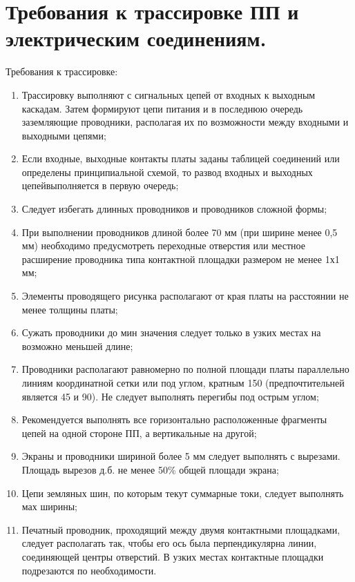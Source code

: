 \documentclass[unicode, 12pt, a4paper, oneside]{article}
\begin{document}
\section{Требования к трассировке ПП и электрическим соединениям.}

Требования к трассировке:

\begin{enumerate}
\item Трассировку выполняют с сигнальных цепей от входных к выходным каскадам. Затем формируют цепи питания и в последнюю очередь заземляющие проводники, располагая их по возможности между входными и выходными цепями;
\item Если входные, выходные контакты платы заданы таблицей соединений или определены принципиальной схемой, то развод входных и выходных цепейвыполняется в первую очередь;
\item Следует избегать длинных проводников и проводников сложной формы;
\item При выполнении проводников длиной более 70 мм (при ширине менее 0,5 мм) необходимо предусмотреть переходные отверстия или местное расширение проводника типа контактной площадки размером не менее 1х1 мм;
\item Элементы проводящего рисунка располагают от края платы на расстоянии не менее толщины платы;
\item Сужать проводники до мин значения следует только в узких местах на возможно меньшей длине;
\item Проводники располагают равномерно по полной площади платы параллельно линиям координатной сетки или под углом, кратным 150 (предпочтительней является 45 и 90). Не следует выполнять перегибы под острым углом;
\item Рекомендуется выполнять все горизонтально расположенные фрагменты цепей на одной стороне ПП, а вертикальные на другой;
\item Экраны и проводники шириной более 5 мм следует выполнять с вырезами. Площадь вырезов д.б. не менее 50\% общей площади экрана;
\item Цепи земляных шин, по которым текут суммарные токи, следует выполнять мах ширины;
\item Печатный проводник, проходящий между двумя контактными площадками, следует располагать так, чтобы его ось была перпендикулярна линии, соединяющей центры отверстий. В узких местах контактные площадки подрезаются по необходимости.
\end{enumerate}
\end{document}
